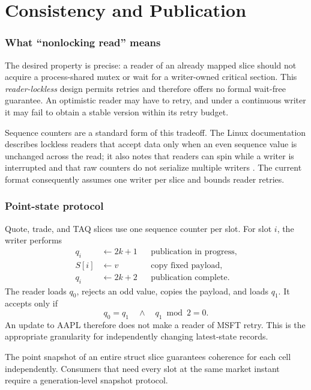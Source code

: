 \documentclass{strategynet-journal}
\begin{document}
\part{Consistency and Publication}

\begin{SNcolumns}

\section{What ``nonlocking read'' means}

The desired property is precise: a reader of an already mapped slice should
not acquire a process-shared mutex or wait for a writer-owned critical section.
This \emph{reader-lockless} design permits retries and therefore offers no formal
wait-free guarantee.  An optimistic reader may have to retry, and under a
continuous writer it may fail to obtain a stable version within its retry
budget.

Sequence counters are a standard form of this tradeoff.  The Linux
documentation describes lockless readers that accept data only when an even
sequence value is unchanged across the read; it also notes that readers can
spin while a writer is interrupted and that raw counters do not serialize
multiple writers \cite{seqlock}.  The current format consequently assumes one
writer per slice and bounds reader retries.

\section{Point-state protocol}

Quote, trade, and TAQ slices use one sequence counter per slot.  For slot
\(i\), the writer performs
\[
\begin{aligned}
  q_i&\leftarrow 2k+1 && \text{publication in progress},\\
  S[i]&\leftarrow v && \text{copy fixed payload},\\
  q_i&\leftarrow 2k+2 && \text{publication complete}.
\end{aligned}
\]
The reader loads \(q_0\), rejects an odd value, copies the payload, and loads
\(q_1\).  It accepts only if
\[
  q_0=q_1\quad\land\quad q_1\bmod 2=0.
\]
An update to AAPL therefore does not make a reader of MSFT retry.  This is the
appropriate granularity for independently changing latest-state records.

The point snapshot of an entire struct slice guarantees coherence for each
cell independently.  Consumers that need every slot at the same market instant require
a generation-level snapshot protocol.


\end{SNcolumns}
\end{document}
